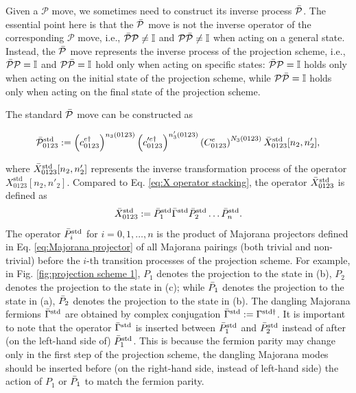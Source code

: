\documentclass[%
 reprint,
 amsmath,amssymb,
 aps,
prb,
]{revtex4-2}
\begin{document}
Given a $\mathcal P$ move, we sometimes need to construct its inverse process $\Bar{\mathcal P}$.
The essential point here is that the $\Bar{\mathcal P}$ move is not the inverse operator of the corresponding $\mathcal P$ move, i.e., $\Bar{\mathcal P} \mathcal P \neq \mathbb I$ and $\mathcal P \Bar{\mathcal P} \neq \mathbb I$ when acting on a general state.
Instead, the $\Bar{\mathcal P}$ move represents the inverse process of the projection scheme, i.e., $\Bar{\mathcal P} \mathcal P = \mathbb I$ and $\mathcal P \Bar{\mathcal P} = \mathbb I$ hold only when acting on specific states: $\Bar{\mathcal P} \mathcal P = \mathbb I$ holds only when acting on the initial state of the projection scheme, while $\mathcal P \Bar{\mathcal P} = \mathbb I$ holds only when acting on the final state of the projection scheme.

The standard $\Bar{\mathcal P}$ move can be constructed as
\begin{widetext}
\begin{equation}
\Bar{\mathcal{P}} _{0123}^{\mathrm{std}} := \left( c_{0123}^{e \dagger}\right)^{n_{3}( 0123)} \left( c^{\prime e \dagger}_{0123}\right)^{n'_{3}( 0123)} \left( C_{0123}^{e}\right)^{N_{3}( 0123)} \Bar{X} _{0123}^{\mathrm{std}}[ n_{2} ,n'_{2}] ,\label{eq:Pbar std}
\end{equation}
\end{widetext}
where $\Bar{X} _{0123}^{\mathrm{std}}[ n_{2} ,n'_{2}]$ represents the inverse transformation process of the operator $X_{0123}^{\mathrm{std}}[ n_{2} ,n'_{2}]$.
Compared to Eq. \eqref{eq:X operator stacking}, the operator $\Bar{X} _{0123}^{\mathrm{std}}$ is defined as 
\begin{equation}
\Bar{X} ^{\mathrm{std}} _{0123} := \Bar{P} ^{\mathrm{std}}_1 \Bar{\Gamma} ^{\mathrm{std}} \Bar{P} ^{\mathrm{std}}_2 \dots \Bar{P} ^{\mathrm{std}}_n .\label{eq:Pbar X std}
\end{equation}
The operator $\Bar{P} ^{\mathrm{std}}_i$ for $i = 0, 1, \dots, n$ is the product of Majorana projectors defined in Eq. \eqref{eq:Majorana projector} of all Majorana pairings (both trivial and non-trivial) before the $i$-th transition processes of the projection scheme.
For example, in Fig. \ref{fig:projection scheme 1}, $P_1$ denotes the projection to the state in (b), $P_2$ denotes the projection to the state in (c); while $\Bar{P} _1$ denotes the projection to the state in (a), $\Bar{P} _2$ denotes the projection to the state in (b).
The dangling Majorana fermions $\Bar{\Gamma} ^{\mathrm{std}}$ are obtained by complex conjugation $\Bar{\Gamma} ^{\mathrm{std}} := \Gamma^{\mathrm{std} \dagger}$.
It is important to note that the operator $\Bar{\Gamma} ^{\mathrm{std}}$ is inserted between $\Bar{P} ^{\mathrm{std}}_1$ and $\Bar{P} ^{\mathrm{std}}_2$ instead of after (on the left-hand side of) $\Bar{P} ^{\mathrm{std}}_1$.
This is because the fermion parity may change only in the first step of the projection scheme, the dangling Majorana modes should be inserted before (on the right-hand side, instead of left-hand side) the action of $P_1$ or $\Bar{P} _1$ to match the fermion parity.
\end{document}
